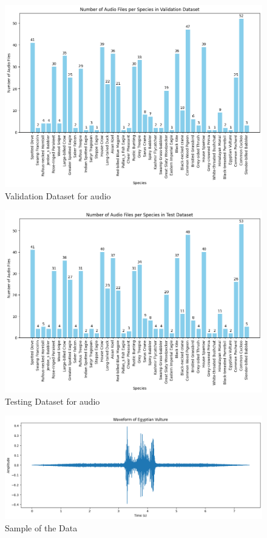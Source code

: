 \begin{figure}[h!]
    \centering
    \includegraphics[scale=0.4]{images/ValidationDataset.png}
    \caption{Validation Dataset for audio}
\end{figure}
\newpage
\begin{figure}[h!]
    \centering
    \includegraphics[scale=0.4]{images/TestDataset.png}
    \caption{Testing Dataset for audio}
\end{figure}
\hspace{3.5cm}
\begin{figure}[h!]
    \centering
    \includegraphics[scale=0.3]{images/SampleData.png}
    \caption{Sample of the Data}
    \label{fig:SampleData}
\end{figure}
\newpage
